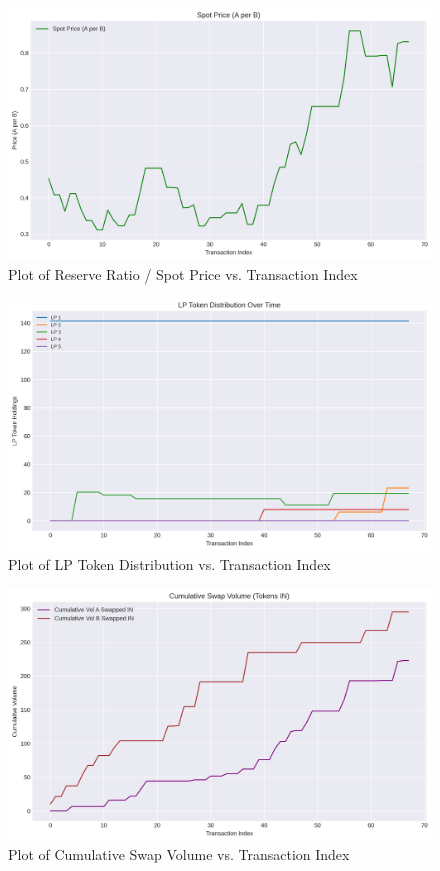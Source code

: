 \documentclass[12pt]{article}
\begin{document}
\begin{figure}[H]
    \centering
    \includegraphics[width=\textwidth]{../task2_plots/spot_price_a_per_b.png}
    \caption{Plot of Reserve Ratio / Spot Price vs. Transaction Index}
    \label{fig:ratio}
\end{figure}

\begin{figure}[H]
    \centering
    \includegraphics[width=\textwidth]{../task2_plots/lp_distribution.png}
    \caption{Plot of LP Token Distribution vs. Transaction Index}
    \label{fig:lp_dist}
\end{figure}

\begin{figure}[H]
    \centering
    \includegraphics[width=\textwidth]{../task2_plots/swap_volume.png}
    \caption{Plot of Cumulative Swap Volume vs. Transaction Index}
    \label{fig:volume}
\end{figure}
\end{document}
